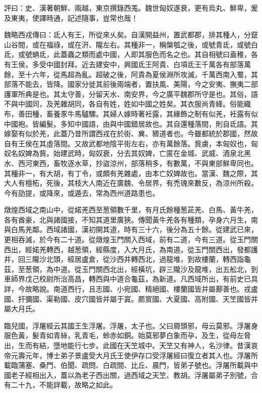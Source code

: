 \begin{pinyinscope}
評曰：史、漢著朝鮮、兩越，東京撰錄西羗。魏世匈奴遂衰，更有烏丸、鮮卑，爰及東夷，使譯時通，記述隨事，豈常也哉！

魏略西戎傳曰：氐人有王，所從來乆矣。自漢開益州，置武都郡，排其種人，分竄山谷間，或在福祿，或在汧、隴左右。其種非一，稱槃瓠之後，或號青氐，或號白氐，或號蚺氐，此蓋蟲之類而處中國，人即其服色而名之也。其自相號曰盍稚，各有王侯，多受中國封拜。近去建安中，興國氐王阿貴、白項氐王千萬各有部落萬餘，至十六年，從馬超為亂。超破之後，阿貴為夏侯淵所攻滅，千萬西南入蜀，其部落不能去，皆降。國家分徙其前後兩端者，置扶風、美陽，今之安夷、撫夷二部護軍所典是也。其太守善，分留天水、南安界，今之廣平魏郡所守是也。其俗，語不與中國同，及羌雜胡同，各自有姓，姓如中國之姓矣。其衣服尚青絳。俗能織布，善田種，畜養豕牛馬驢騾。其婦人嫁時著衽露，其緣飾之制有似羌，衽露有似中國袍。皆編髮。多知中國語，由與中國錯居故也。其自還種落間，則自氐語。其嫁娶有似於羌，此蓋乃昔所謂西戎在於街、兾、豲道者也。今雖都統於郡國，然故自有王侯在其虛落間。又故武都地陰平街左右，亦有萬餘落。貲虜，本匈奴也，匈奴名奴婢為貲。始建武時，匈奴衰，分去其奴婢，亡匿在金城、武威、酒泉北黑水、西河東西，畜牧逐水草，抄盜涼州，部落稍多，有數萬，不與東部鮮卑同也。其種非一，有大胡，有丁令，或頗有羌雜處，由本亡奴婢故也。當漢、魏之際，其大人有檀柘，死後，其枝大人南近在廣魏、令居界，有禿瑰來數反，為涼州所殺。今有劭提，或降來，或遁去，常為西州道路患也。

燉煌西域之南山中，從婼羌西至葱領數千里，有月氏餘種葱茈羌、白馬、黃牛羌，各有酋豪，北與諸國接，不知其道里廣狹。傳聞黃牛羌各有種類，孕身六月生，南與白馬羌鄰。西域諸國，漢初開其道，時有三十六，後分為五十餘。從建武已來，更相吞滅，於今有二十道。從燉煌玉門關入西域，前有二道，今有三道。從玉門關西出，經婼羌轉西，越葱領，經縣度，入大月氏，為南道。從玉門關西出，發都護井，回三隴沙北頭，經居盧倉，從沙西井轉西北，過龍堆，到故樓蘭，轉西詣龜茲，至葱領，為中道。從玉門關西北出，經橫坑，辟三隴沙及龍堆，出五舩北，到車師界戊己校尉所治高昌，轉西與中道合龜茲，為新道。凡西域所出，有前史已具詳，今故略說。南道西行，且志國、小宛國、精絕國、樓蘭國皆并屬鄯善也。戎盧國、扞彌國、渠勒國、皮穴國皆并屬于寘。罽賔國、大夏國、高附國、天笁國皆并屬大月氏。

臨兒國，浮屠經云其國王生浮屠。浮屠，太子也。父曰屑頭邪，母云莫邪。浮屠身服色黃，髮青如青絲，乳青毛，蛉赤如銅。始莫邪夢白象而孕，及生，從母左脅出，生而有結，墮地能行七步。此國在天笁城中。天笁又有神人，名沙律。昔漢哀帝元壽元年，博士弟子景盧受大月氏王使伊存口受浮屠經曰復立者其人也。浮屠所載臨蒲塞、桑門、伯聞、疏問、白疏間、比丘、晨門，皆弟子號也。浮屠所載與中國老子經相出入，蓋以為老子西出關，過西域之天笁、教胡。浮屠屬弟子別號，合有二十九，不能詳載，故略之如此。


\end{pinyinscope}
